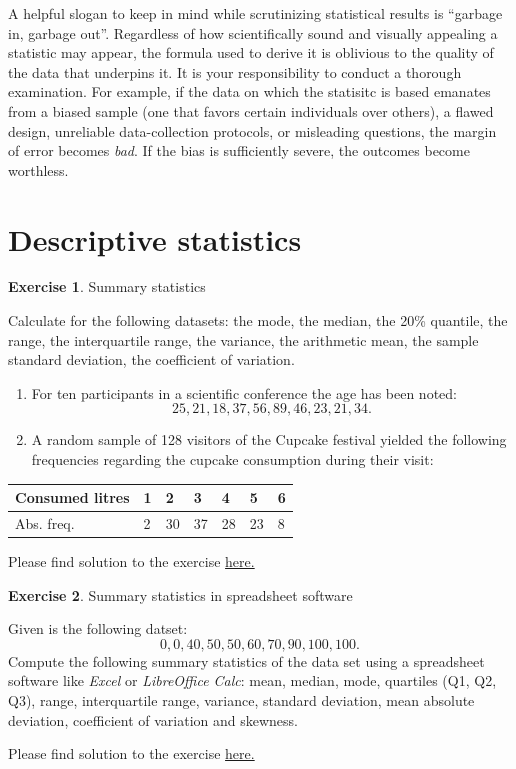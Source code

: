 \documentclass[
  12pt,
  oneside]{book}
\providecommand{\tightlist}{%
  \setlength{\itemsep}{0pt}\setlength{\parskip}{0pt}}
\theoremstyle{definition}
\theoremstyle{definition}
\theoremstyle{definition}
\newtheorem{exercise}{Exercise}[chapter]
\theoremstyle{definition}
\theoremstyle{remark}
\begin{document}
A helpful slogan to keep in mind while scrutinizing statistical results is ``garbage in, garbage out''. Regardless of how scientifically sound and visually appealing a statistic may appear, the formula used to derive it is oblivious to the quality of the data that underpins it. It is your responsibility to conduct a thorough examination. For example, if the data on which the statisitc is based emanates from a biased sample (one that favors certain individuals over others), a flawed design, unreliable data-collection protocols, or misleading questions, the margin of error becomes \emph{bad}. If the bias is sufficiently severe, the outcomes become worthless.

\hypertarget{descriptive-statistics}{%
\section{Descriptive statistics}\label{descriptive-statistics}}

\begin{exercise}
\protect\hypertarget{exr:summarystatistics}{}\label{exr:summarystatistics}Summary statistics

Calculate for the following datasets: the mode, the median, the 20\% quantile, the range, the interquartile range, the variance, the arithmetic mean, the sample standard deviation, the coefficient of variation.

\begin{enumerate}
\def\labelenumi{\alph{enumi})}
\tightlist
\item
  For ten participants in a scientific conference the age
  has been noted: \[25, 21, 18, 37, 56, 89, 46, 23, 21, 34.\]
\item
  A random sample of 128 visitors of the Cupcake festival yielded the following frequencies regarding the cupcake consumption during their visit:
\end{enumerate}

\begin{longtable}[]{@{}lllllll@{}}
\toprule()
Consumed litres & 1 & 2 & 3 & 4 & 5 & 6 \\
\midrule()
\endhead
Abs. freq. & 2 & 30 & 37 & 28 & 23 & 8 \\
\bottomrule()
\end{longtable}

Please find solution to the exercise \protect\hyperlink{sol:summarystatistics}{here.}
\end{exercise}

\begin{exercise}
\protect\hypertarget{exr:destatexcel}{}\label{exr:destatexcel}Summary statistics in spreadsheet software

Given is the following datset: \[0, 0, 40, 50, 50, 60, 70, 90, 100, 100.\]
Compute the following summary statistics of the data set using a spreadsheet software like \textit{Excel} or \textit{LibreOffice Calc}:
mean, median, mode, quartiles (Q1, Q2, Q3), range, interquartile range, variance, standard deviation, mean absolute deviation, coefficient of variation and skewness.

Please find solution to the exercise \protect\hyperlink{sol:destatexcel}{here.}
\end{exercise}
\end{document}
